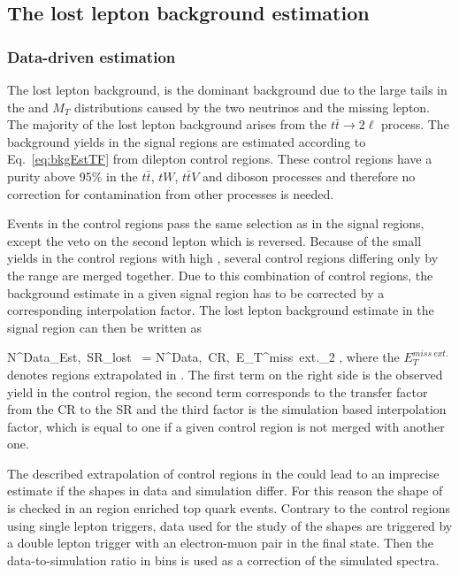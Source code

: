 \newpage
\subsection{The lost lepton background estimation}

\subsubsection{Data-driven estimation}

The lost lepton background,  is the dominant background due to the large tails in the \MET and $M_{T}$ distributions caused by the two neutrinos and the missing lepton. The majority of the lost lepton background arises from the $t\bar{t} \to 2\ell$ process. The background yields in the signal regions are estimated according to Eq.~\ref{eq:bkgEstTF} from dilepton control regions. These control regions have a purity above 95\% in the $t\bar{t}$, $tW$, $t\bar{t}V$ and diboson processes and therefore no correction for contamination from other processes is needed. 

Events in the control regions pass the same selection as in the signal regions, except the veto on the second lepton which is reversed. Because of the small yields in the control regions with high \MET, several control regions differing only by the \MET range are merged together. Due to this combination of control regions, the background estimate in a given signal region has to be corrected by a corresponding interpolation factor. The lost lepton background estimate in the signal region can then be written as

{
N^{Data_{Est},~SR}_{lost~\ell}  =  N^{Data,~CR,~E_{T}^{miss}~ext.}_{2\ell} \times  {} \times {},
}
where the $E_{T}^{miss~ext.}$ denotes regions extrapolated in \MET. The first term on the right side is the observed yield in the control region, the second term corresponds to the transfer factor from the CR to the SR  and the third factor is the simulation based \MET interpolation factor, which is equal to one if a given control region is not merged with another one.

The described extrapolation of control regions in the \MET could lead to an imprecise estimate if the \MET shapes in data and simulation differ. For this reason the shape of \MET is checked in an region enriched top quark events. Contrary to the control regions using single lepton triggers, data used for the study of the \MET shapes are triggered by a  double lepton trigger with an electron-muon pair in the final state. Then the data-to-simulation ratio in \MET bins is used as a correction of the simulated \MET spectra. 

